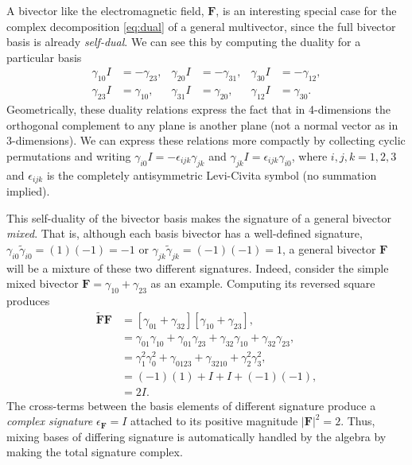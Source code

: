 \documentclass[1p,sort&compress]{elsarticle}
\numberwithin{equation}{section}
\newcommand{\bv}[1]{\mathbf{#1}}
\begin{document}
A bivector like the electromagnetic field, $\bv{F}$, is an interesting special case for the complex decomposition \eqref{eq:dual} of a general multivector, since the full bivector basis is already \emph{self-dual}.  We can see this by computing the duality for a particular basis
\begin{align}\label{eq:bivectorduality}
  \gamma_{10}I &= -\gamma_{23}, & \gamma_{20}I &= -\gamma_{31}, & \gamma_{30}I &= -\gamma_{12}, \\
  \gamma_{23}I &= \gamma_{10}, & \gamma_{31}I &= \gamma_{20}, & \gamma_{12}I &= \gamma_{30}. \nonumber
\end{align}
Geometrically, these duality relations express the fact that in 4-dimensions the orthogonal complement to any plane is another plane (not a normal vector as in 3-dimensions).  We can express these relations more compactly by collecting cyclic permutations and writing $\gamma_{i0}I = -\epsilon_{ijk}\gamma_{jk}$ and $\gamma_{jk}I = \epsilon_{ijk}\gamma_{i0}$, where $i,j,k = 1,2,3$ and $\epsilon_{ijk}$ is the completely antisymmetric Levi-Civita symbol (no summation implied).  

This self-duality of the bivector basis makes the signature of a general bivector \emph{mixed}.  That is, although each basis bivector has a well-defined signature, $\gamma_{i0}\widetilde{\gamma}_{i0} = (1)(-1) = -1$ or $\gamma_{jk}\widetilde{\gamma}_{jk} = (-1)(-1) = 1$, a general bivector $\bv{F}$ will be a mixture of these two different signatures.  Indeed, consider the simple mixed bivector $\bv{F} = \gamma_{10} + \gamma_{23}$ as an example.  Computing its reversed square produces
\begin{align}
  \widetilde{\bv{F}}\bv{F} &= [\gamma_{01} + \gamma_{32}][\gamma_{10} + \gamma_{23}], \\
  &= \gamma_{01}\gamma_{10} + \gamma_{01}\gamma_{23} + \gamma_{32}\gamma_{10} + \gamma_{32}\gamma_{23}, \nonumber \\
  &= \gamma_1^2\gamma_0^2 + \gamma_{0123} + \gamma_{3210} + \gamma_2^2\gamma_3^2, \nonumber \\
  &= (-1)(1) + I + I + (-1)(-1), \nonumber \\
  &= 2 I. \nonumber
\end{align}
The cross-terms between the basis elements of different signature produce a \emph{complex signature} $\epsilon_{\bv{F}} = I$ attached to its positive magnitude $|\bv{F}|^2 = 2$.  Thus, mixing bases of differing signature is automatically handled by the algebra by making the total signature complex.
  
\end{document}
